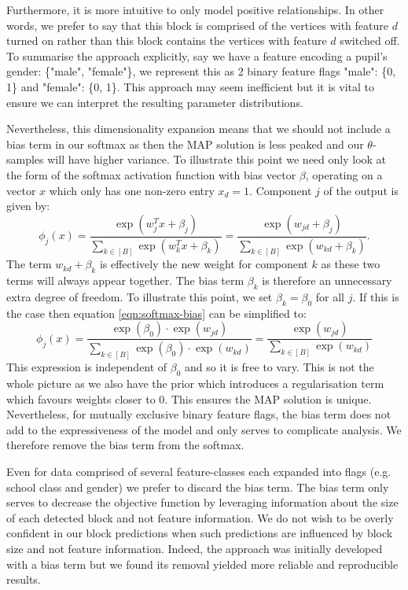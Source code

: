 Furthermore, it is more intuitive to only model positive relationships. In other words, we prefer to say that this block is comprised of the vertices with feature $d$ turned on rather than this block contains the vertices with feature $d$ switched off. To summarise the approach explicitly, say we have a feature encoding a pupil's gender: \{"male", "female"\}, we represent this as 2 binary feature flags "male": \{0, 1\} and "female": \{0, 1\}. This approach may seem inefficient but it is vital to ensure we can interpret the resulting parameter distributions.

Nevertheless, this dimensionality expansion means that we should not include a bias term in our softmax as then the MAP solution is less peaked and our $\theta$-samples will have higher variance. To illustrate this point we need only look at the form of the softmax activation function with bias vector $\beta$, operating on a vector $x$ which only has one non-zero entry $x_d=1$. Component $j$ of the output is given by:
%
\begin{equation}
	\phi_j(x) = \frac{\exp(w_j^T x + \beta_j)}{\sum_{k \in [B]} \exp(w_k^T x + \beta_k)} = 
	\frac{\exp(w_{jd} + \beta_j)}{\sum_{k \in [B]} \exp({w_{kd} + \beta_k})}.
	\label{eqn:softmax-bias}
\end{equation}
%
The term $w_{kd} + \beta_k$ is effectively the new weight for component $k$ as these two terms will always appear together. The bias term $\beta_k$ is therefore an unnecessary extra degree of freedom. To illustrate this point, we set $\beta_k=\beta_0$ for all $j$. If this is the case then equation \ref{eqn:softmax-bias} can be simplified to:
%
\begin{equation}
	\phi_j(x) = \frac{\exp(\beta_0) \cdot \exp(w_{jd})}{\sum_{k \in [B]} \exp(\beta_0) \cdot \exp(w_{kd})}
	= \frac{\exp(w_{jd})}{\sum_{k \in [B]} \exp(w_{kd})}
\end{equation}
%
This expression is independent of $\beta_0$ and so it is free to vary. This is not the whole picture as we also have the prior which introduces a regularisation term which favours weights closer to 0. This ensures the MAP solution is unique. Nevertheless, for mutually exclusive binary feature flags, the bias term does not add to the expressiveness of the model and only serves to complicate analysis. We therefore remove the bias term from the softmax.

Even for data comprised of several feature-classes each expanded into flags (e.g. school class and gender) we prefer to discard the bias term. The bias term only serves to decrease the objective function by leveraging information about the size of each detected block and not feature information. We do not wish to be overly confident in our block predictions when such predictions are influenced by block size and not feature information. Indeed, the approach was initially developed with a bias term but we found its removal yielded more reliable and reproducible results.

